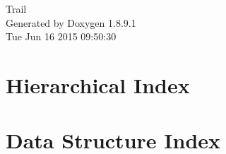 \documentclass[twoside]{book}
\newcommand{\+}{\discretionary{\mbox{\scriptsize$\hookleftarrow$}}{}{}}
\newcommand{\clearemptydoublepage}{%
  \newpage{\pagestyle{empty}\cleardoublepage}%
}
\begin{document}
\hypersetup{pageanchor=false,
             bookmarks=true,
             bookmarksnumbered=true,
             pdfencoding=unicode
            }
\begin{titlepage}
\vspace*{7cm}
\begin{center}%
{\Large Trail }\\
\vspace*{1cm}
{\large Generated by Doxygen 1.8.9.1}\\
\vspace*{0.5cm}
{\small Tue Jun 16 2015 09:50:30}\\
\end{center}
\end{titlepage}
\clearemptydoublepage
\tableofcontents
\clearemptydoublepage
{}
\hypersetup{pageanchor=true}

\chapter{Hierarchical Index}

\chapter{Data Structure Index}

\end{document}
